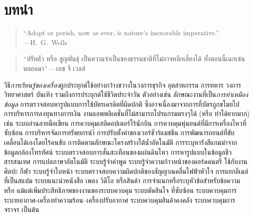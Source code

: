 \chapter{บทนำ}
\label{chapter: introduction}

\begin{verse}
``Adapt or perish, now as ever, is nature's inexorable imperative.'' \\
---H.~G.~Wells 
\end{verse}

\begin{verse}
``ปรับตัว หรือ สูญพันธุ์ เป็นความจำเป็นของธรรมชาติที่ไม่อาจหลีกเลี่ยงได้ ทั้งตอนนี้เฉกเช่นตลอดมา'' 
---เอช จี เวลส์ \\
\end{verse}

วิธี\textit{การเรียนรู้ของเครื่อง}ถูกประยุกต์ใช้อย่างกว้างขวางในวงการธุรกิจ อุตสาหกรรม การทหาร วงการวิทยาศาสตร์ บันเทิง รวมถึงการประยุกต์ใช้ชีวิตประจำวัน
ตัวอย่างเช่น 
ลักษณะงานที่เป็น\textit{การทำเหมืองข้อมูล} การตรวจสอบหารูปแบบการใช้บัตรเครดิตที่ผิดปกติ\cite{DeviEtAl2014a} ซึ่งอาจเนื่องมาจากการที่บัตรถูกขโมยไป
การบริหารการลงทุนทางการเงิน\cite{TanEtAl2011a}
งานแอพพลิเคชั่นที่ไม่สามารถโปรแกรมตรงๆได้ (หรือ ทำได้ยากมาก) เช่น ระบบอ่านลายมือเขียน\cite{LeCunEtAl1990a}
การควบคุมเฮลิคอปเตอร์ไร้นักบิน\cite{CoatesEtAl2009a} 
การควบคุมหุ่นยนต์ที่มีการเครื่องไหวที่ซับซ้อน\cite{AkiyamaEtAl2010a}
การบริหารจัดการทรัพยกรนำ้\cite{CastellettiEtAl2013a}
การปรับตั้งค่าของเวอร์ชัวร์แมชชีน\cite{RaoEtAl2009a}
การพัฒนารถยนต์ที่ขับเคลื่อนได้เองโดยไร้คนขับ\cite{ZhuEtAl2014a}
การติดตามลักษณะโครงสร้างใต้น้ำอัตโนมัติ\cite{MagazzeniEtAl2014a}
การระบุหารังสีแกมม่าจากข้อมูลกล้องโทรทัศน์\cite{BockEtAl2004a}
ระบบตรวจสอบการสั่นสะเทือนของแผ่นดินไหว\cite{RuanoEtAl2014a}
การหารูปแบบในข้อมูลชีวสารสนเทศ\cite{KelchtermansEtAl2014a}
การแปลภาษาอัตโนมัติ\cite{CostaFarrus2014a}
ระบบรู้จำคำพูด\cite{SarikayaEtAl2014a}
ระบบรู้จำความก้าวหน้าของคอร์ดดนตรี\cite{YuElAl2013a}
ใช้กับงานศิลปะ\cite{CuljakEtAl2011a}
กีฬา\cite{HolstJanasson2013a}
ระบบรู้จำใบหน้า\cite{BarnardEtAl2013a}
ระบบตรวจสอบความผิดปกติของสัญญาณคลื่นไฟฟ้าหัวใจ\cite{LiEtAl2012a}
การแยกอีเมล์ที่เป็นสแปม\cite{BlanzieriBryl2008a} 
ระบบแนะนำหนังสือ เพลง วิดีโอ หรือสินค้า\cite{GhazanfarPrugel-Bennett2014a}
การจำแนกหรือระบุหัวข้อสำหรับข้อความ\cite{BleiEtAl2003a}
หรือ แม้แต่เพิ่มประสิทธิภาพของงานของระบบควบคุม ระบบตัดสินใจ ที่ซับซ้อน ระบบควบคุมการระบายอากาศ-เครื่องทำความร้อน--เครื่องปรับอากาศ\cite{AndersonEtAl2004a} 
ระบบควบคุมสินค้าคงคลัง\cite{KatanyukulEtAl2011a, KatanyukulEtAl2012a, Katanyukul2013a, KatanyukulChong2014a} 
ระบบควบคุมการจราจร\cite{ChanlohaEtAl2014a} เป็นต้น 

